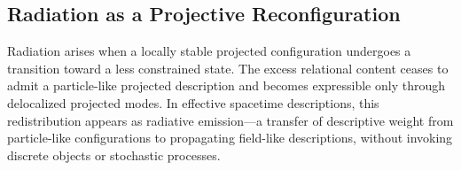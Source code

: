 \subsection{Radiation as a Projective Reconfiguration}
  \label{subsec:radiation-as-chimatter-interaction}

  Radiation arises when a locally stable projected configuration undergoes
  a transition toward a less constrained state.
  The excess relational content ceases to admit a particle-like projected
  description and becomes expressible only through delocalized projected modes.
  In effective spacetime descriptions, this redistribution appears as
  radiative emission---a transfer of descriptive weight from particle-like
  configurations to propagating field-like descriptions, without invoking
  discrete objects or stochastic processes.
